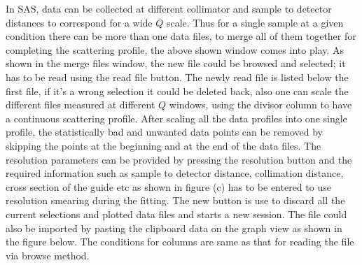 In SAS, data can be collected at different collimator and sample to
detector distances to correspond for a wide $Q$ scale. Thus for a
single sample at a given condition there can be more than one data
files, to merge all of them together for completing the scattering
profile, the above shown window comes into play. As shown in the
merge files window, the new file could be browsed and selected; it
has to be read using the read file button. The newly read file
is listed below the first file, if it's a wrong selection it could
be deleted back, also one can scale the different files measured at
different $Q$ windows, using the divisor column to have a continuous
scattering profile. After scaling all the data profiles into one
single profile, the statistically bad and unwanted data points can
be removed by skipping the points at the beginning and at the end of
the data files. The resolution parameters can be provided by
pressing the resolution button and the required information such as
sample to detector distance, collimation distance, cross section of
the guide etc as shown in figure  \label{fig:QTmergeSDS}(c) has to be entered to use
resolution smearing during the fitting. The new button is use to
discard all the current selections and plotted data files and starts
a new session. The file could also be imported by pasting the
clipboard data on the graph view as shown in the figure below. The
conditions for columns are same as that for reading the file via
browse method.


